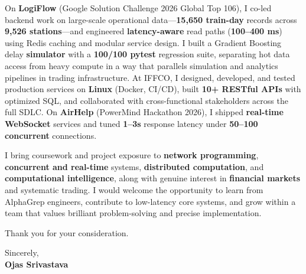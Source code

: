\documentclass[a4paper,11pt]{article}
\begin{document}
On \textbf{LogiFlow} (Google Solution Challenge 2026 Global Top 106), I co-led backend work on large-scale operational data---\textbf{15,650 train-day} records across \textbf{9,526 stations}---and engineered \textbf{latency-aware} read paths (\textbf{100--400 ms}) using Redis caching and modular service design. I built a Gradient Boosting delay \textbf{simulator} with a \textbf{100/100 pytest} regression suite, separating hot data access from heavy compute in a way that parallels simulation and analytics pipelines in trading infrastructure. At IFFCO, I designed, developed, and tested production services on \textbf{Linux} (Docker, CI/CD), built \textbf{10+ RESTful APIs} with optimized SQL, and collaborated with cross-functional stakeholders across the full SDLC. On \textbf{AirHelp} (PowerMind Hackathon 2026), I shipped \textbf{real-time WebSocket} services and tuned \textbf{1--3s} response latency under \textbf{50--100 concurrent} connections.

I bring coursework and project exposure to \textbf{network programming}, \textbf{concurrent and real-time} systems, \textbf{distributed computation}, and \textbf{computational intelligence}, along with genuine interest in \textbf{financial markets} and systematic trading. I would welcome the opportunity to learn from AlphaGrep engineers, contribute to low-latency core systems, and grow within a team that values brilliant problem-solving and precise implementation.

Thank you for your consideration.

Sincerely, \\
\vspace{8mm}
\textbf{Ojas Srivastava}
\end{document}
